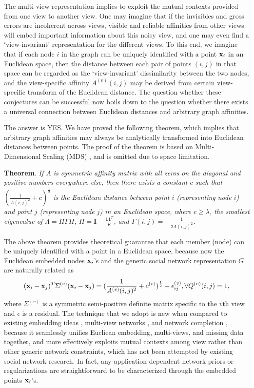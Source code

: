 The multi-view representation implies to exploit the mutual contexts provided from one view to another view. One may imagine that if the invisibles and gross errors are incoherent across views, visible and reliable affinities from other views will embed important information about this noisy view, and one may even find a `view-invariant' representation for the different views. To this end, we imagine that if each node $i$ in the graph can be uniquely identified with a point ${\bf x}_i$ in an Euclidean space, then the distance between each pair of points $(i,j)$ in that space can be regarded as the `view-invariant' dissimilarity between the two nodes, and the view-specific affinity $A^{(v)}(i,j)$ may be derived from certain view-specific transform of the Euclidean distance. The question whether these conjectures can be successful now boils down to the question whether there exists a universal connection between Euclidean distances and arbitrary graph affinities.

The answer is YES. We have proved the following theorem, which implies that arbitrary graph affinities may always be analytically transformed into Euclidean distances between points. The proof of the theorem is based on Multi-Dimensional Scaling (MDS) \cite{CoxMDS}, and is omitted due to space limitation.

\vspace{5pt}
\textbf{Theorem}. \textit{If $A$ is symmetric affinity matrix with all zeros on the diagonal and positive numbers everywhere else, then there exists a constant $c$ such that $(\frac{1}{A(i,j)^2}+c)^{\frac{1}{2}}$ is the Euclidean distance between point $i$ (representing node $i$) and point $j$ (representing node $j$) in an Euclidean space, where $c\geq\lambda$, the smallest eigenvalue of $\Lambda=H\Gamma H$, $H=\mathbf{I}-\frac{\mathbf{1}\mathbf{1}^T}{K}$, and $\Gamma(i,j)=-\frac{1}{2A(i,j)^2}$.} 
\vspace{5pt}


The above theorem provides theoretical guarantee that each member (node) can be uniquely identified with a point in a Euclidean space, because now the Euclidean embedded nodes ${\bf x}_i$'s and the generic social network representation $G$ are naturally related as
\begin{equation}\label{eq:embed}
({\bf x}_i-{\bf x}_j)^{T}\Sigma^{(v)}({\bf x}_i-{\bf x}_j)=(\frac{1}{A^{(v)}(i,j)^2}+c^{(v)})^{\frac{1}{2}}+\epsilon^{(v)}_{ij}, \forall Q^{(v)}(i,j)=1,
\end{equation}
where $\Sigma^{(v)}$ is a symmetric semi-positive definite matrix specific to the $v$th view and $\epsilon$ is a residual. The technique that we adopt is new when compared to existing embedding ideas \cite{Hoff01latentspace,Hancocklatent}, multi-view networks \cite{AiroldiBFX08,Kim12}, and network completion \cite{Clauset,Guimera,HannekeX09,KimL11}, because it seamlessly unifies Eucliean embedding, multi-views, and missing data together, and more effectively exploits mutual contexts among view rather than other generic network constraints, which has not been attempted by existing social network research. In fact, any application-dependent network priors or regularizations are straightforward to be characterized through the embedded points ${\bf x}_i$'s. 


